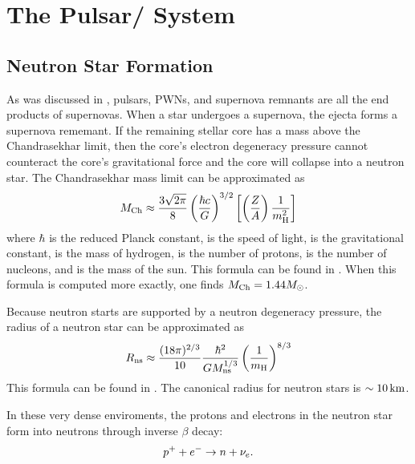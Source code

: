 \section{The Pulsar/ System}

\subsection{Neutron Star Formation}

As was discussed in , pulsars, 
\acp{PWN},
and supernova remnants are all the end products of supernovas.  When a
star undergoes a supernova, the ejecta forms a supernova rememant.  If the
remaining stellar core has a mass above the Chandrasekhar limit,
then the core's electron degeneracy pressure cannot counteract the core's
gravitational force and the core will collapse into a neutron star.
The Chandrasekhar mass limit can be
approximated as \citep{chandrasekhar_1931_maximum-ideal}
\begin{equation}
  M_\text{Ch} \approx 
  \frac{3\sqrt{2\pi}}{8}
  \left(\frac{\hbar c}{G}\right)^{3/2}
  \left[
  \left(\frac{Z}{A}\right)
  \frac{1}{m_\text{H}^2}
  \right]
\end{equation}
where $\hbar$ is the reduced Planck constant, \speedoflight is the
speed of light, \gravitationalconstant is the gravitational constant,
\MassHydrogen is the mass of hydrogen, \NumberProtons is the
number of protons, \NumberNucleons is the number of nucleons, and
\solarmass is the mass of the sun.  This formula can be found in
\citep{carroll_2006_introduction-modern}.
When this formula is computed more exactly, 
one finds $M_\text{Ch} = 1.44 M_{\odot}$.

Because neutron starts are supported by a
neutron degeneracy pressure,
the radius of a neutron star can be approximated as
\begin{equation}
  R_\text{ns} \approx \frac{(18 \pi)^{2/3}}{10}
  \frac{\hbar^2}{G M_\text{ns}^{1/3}}
  \left(\frac{1}{m_\text{H}}\right)^{8/3}
\end{equation}
This formula can be found in \citep{carroll_2006_introduction-modern}.
The canonical radius for neutron stars is $\sim 10\,\text{km}$.

In these very dense enviroments, the protons and electrons in the neutron
star form into neutrons through inverse $\beta$ decay:
\begin{equation}
  p^+ + e^- 
  \rightarrow n + \nu_e.
\end{equation}

